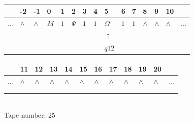 \documentclass[11pt]{article}
\begin{document}
\begin{table}[H]
\centering
\begin{tabular}{lllllllllllllll}
 & -2 & -1 & 0 & 1 & 2 & 3 & 4 & 5 & 6 & 7 & 8 & 9 & 10 & \\
\hline
$...$ & \multicolumn{1}{|l|}{$\wedge$} & \multicolumn{1}{|l|}{$\wedge$} & \multicolumn{1}{|l|}{$M$} & \multicolumn{1}{|l|}{$1$} & \multicolumn{1}{|l|}{$\Psi$} & \multicolumn{1}{|l|}{$1$} & \multicolumn{1}{|l|}{$1$} & \multicolumn{1}{|l|}{$\Omega$} & \multicolumn{1}{|l|}{$1$} & \multicolumn{1}{|l|}{$1$} & \multicolumn{1}{|l|}{$\wedge$} & \multicolumn{1}{|l|}{$\wedge$} & \multicolumn{1}{|l|}{$\wedge$} & $...$\\
\hline
&  &  &  &  &  &  &  & $\uparrow$ &  &  &  &  &  &  \\
&  &  &  &  &  &  &  & $ q12 $ &  &  &  &  &  &  \\
\end{tabular}
\begin{tabular}{llllllllllll}
 & 11 & 12 & 13 & 14 & 15 & 16 & 17 & 18 & 19 & 20 & \\
\hline
$...$ & \multicolumn{1}{|l|}{$\wedge$} & \multicolumn{1}{|l|}{$\wedge$} & \multicolumn{1}{|l|}{$\wedge$} & \multicolumn{1}{|l|}{$\wedge$} & \multicolumn{1}{|l|}{$\wedge$} & \multicolumn{1}{|l|}{$\wedge$} & \multicolumn{1}{|l|}{$\wedge$} & \multicolumn{1}{|l|}{$\wedge$} & \multicolumn{1}{|l|}{$\wedge$} & \multicolumn{1}{|l|}{$\wedge$} & $...$\\
\hline
&  &  &  &  &  &  &  &  &  &  &  \\
&  &  &  &  &  &  &  &  &  &  &  \\
\end{tabular}
\\
Tape number: 25
\noindent\makebox[\linewidth]{\hdashrule{\textwidth}{1pt}{1pt}}\end{table}
\end{document}
